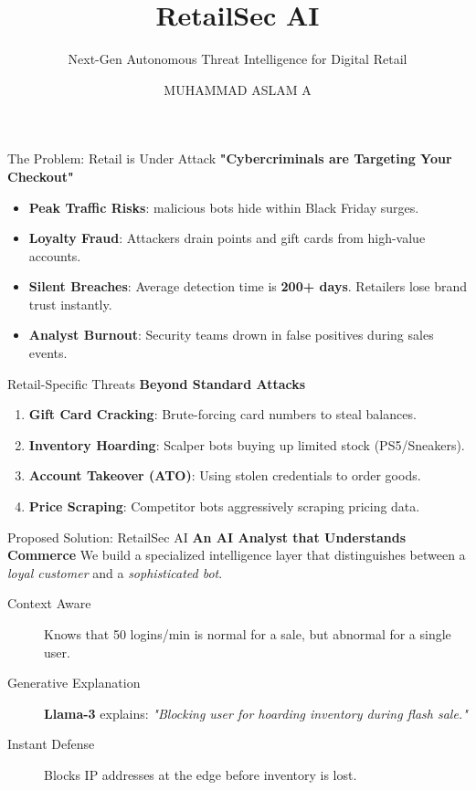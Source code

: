 \documentclass[aspectratio=169]{beamer}
\title{RetailSec AI}
\subtitle{Next-Gen Autonomous Threat Intelligence for Digital Retail}
\date{}
\author{MUHAMMAD ASLAM A}
\institute{Ideathon 2026}
\begin{document}
\begin{frame}
  \titlepage
\end{frame}

\begin{frame}{The Problem: Retail is Under Attack}
    \textbf{"Cybercriminals are Targeting Your Checkout"}
    \vspace{0.5cm}
    \begin{itemize}
        \item \textbf{Peak Traffic Risks}: malicious bots hide within Black Friday surges.
        \item \textbf{Loyalty Fraud}: Attackers drain points and gift cards from high-value accounts.
        \item \textbf{Silent Breaches}: Average detection time is \textbf{200+ days}. Retailers lose brand trust instantly.
        \item \textbf{Analyst Burnout}: Security teams drown in false positives during sales events.
    \end{itemize}
\end{frame}

\begin{frame}{Retail-Specific Threats}
    \textbf{Beyond Standard Attacks}
    \vspace{0.5cm}
    \begin{enumerate}
        \item \textbf{Gift Card Cracking}: Brute-forcing card numbers to steal balances.
        \item \textbf{Inventory Hoarding}: Scalper bots buying up limited stock (PS5/Sneakers).
        \item \textbf{Account Takeover (ATO)}: Using stolen credentials to order goods.
        \item \textbf{Price Scraping}: Competitor bots aggressively scraping pricing data.
    \end{enumerate}
\end{frame}

\begin{frame}{Proposed Solution: RetailSec AI}
    \textbf{An AI Analyst that Understands Commerce}
    \vspace{0.2cm}
    We build a specialized intelligence layer that distinguishes between a \textit{loyal customer} and a \textit{sophisticated bot}.
    \vspace{0.3cm}
    \begin{description}
        \item[Context Aware] Knows that 50 logins/min is normal for a sale, but abnormal for a single user.
        \item[Generative Explanation] \textbf{Llama-3} explains: \textit{"Blocking user for hoarding inventory during flash sale."}
        \item[Instant Defense] Blocks IP addresses at the edge before inventory is lost.
    \end{description}
\end{frame}
\end{document}
